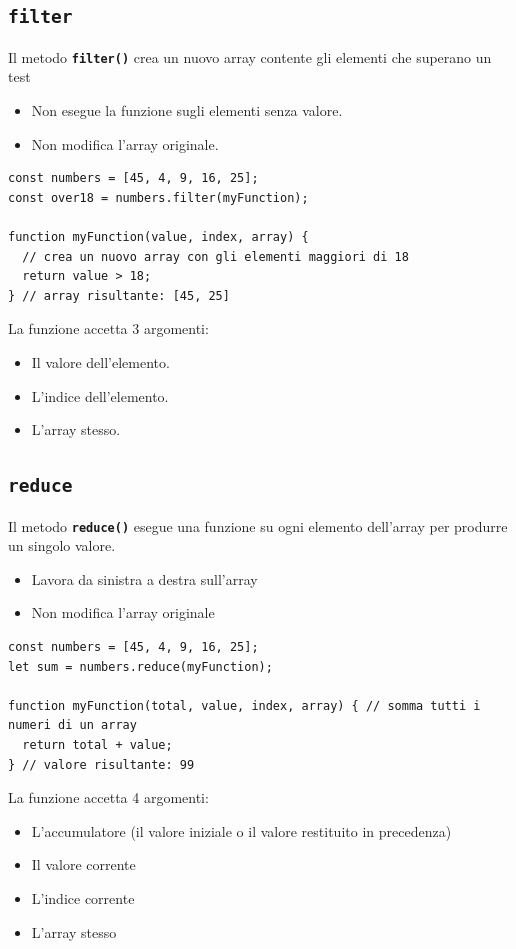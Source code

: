 \subsection{\texttt{filter}}
Il metodo \textbf{\texttt{filter()}} crea un nuovo array contente gli elementi che superano un test
\begin{itemize}
    \item Non esegue la funzione sugli elementi senza valore.
    \item Non modifica l'array originale.
\end{itemize}
\begin{lstlisting}
const numbers = [45, 4, 9, 16, 25];
const over18 = numbers.filter(myFunction);

function myFunction(value, index, array) {
  // crea un nuovo array con gli elementi maggiori di 18
  return value > 18;
} // array risultante: [45, 25]
\end{lstlisting}


La funzione accetta 3 argomenti:
\begin{itemize}
    \item Il valore dell'elemento.
    \item L'indice dell'elemento.
    \item L'array stesso.
\end{itemize}

\subsection{\texttt{reduce}}
Il metodo \textbf{\texttt{reduce()}} esegue una funzione su ogni elemento dell'array per produrre un singolo valore.
\begin{itemize}
    \item Lavora da sinistra a destra sull'array
    \item Non modifica l'array originale
\end{itemize}
\begin{lstlisting}
const numbers = [45, 4, 9, 16, 25];
let sum = numbers.reduce(myFunction);

function myFunction(total, value, index, array) { // somma tutti i numeri di un array
  return total + value;
} // valore risultante: 99
\end{lstlisting}

La funzione accetta 4 argomenti:
\begin{itemize}
    \item L'accumulatore (il valore iniziale o il valore restituito in precedenza)
    \item Il valore corrente
    \item L'indice corrente
    \item L'array stesso
\end{itemize}

